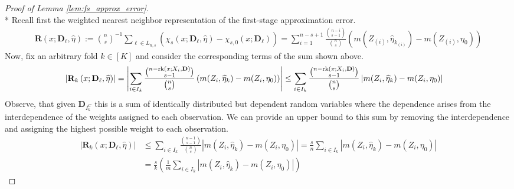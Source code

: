 \begin{proof}[Proof of Lemma \ref{lem:fs_approx_error}]\mbox{}\\*
    Recall first the weighted nearest neighbor representation of the first-stage approximation error.
    \begin{equation}
        \begin{aligned}
            \mathbf{R}\left(x; \mathbf{D}_{\ell}, \hat{\eta}\right)
            := \binom{n}{s}^{-1}\sum_{\ell \in L_{n,s}}\left(\chi_{s}\left(x; \mathbf{D}_{\ell}, \hat{\eta}\right) - \chi_{s,0}\left(x; \mathbf{D}_{\ell}\right)\right) 
            = \sum_{i = 1}^{n - s + 1} \frac{\binom{n-i}{s-1}}{\binom{n}{s}} \left(m(Z_{(i)}, \hat{\eta}_{k_{(i)}}) - m(Z_{(i)}, \eta_{0})\right)
        \end{aligned}
    \end{equation}
    Now, fix an arbitrary fold $k \in [K]$ and consider the corresponding terms of the sum shown above.
    \begin{equation}
        \begin{aligned}
            \left| \mathbf{R}_{k}\left(x; \mathbf{D}_{\ell}, \widehat{\eta}\right) \right|
            & = \left| \sum_{i \in I_{k}} \frac{\binom{n - \text{rk}(x; X_{i}, \mathbf{D})}{s-1}}{\binom{n}{s}} \left(m(Z_{i}, \widehat{\eta}_{k}) - m(Z_{i}, \eta_{0})\right) \right|
            \leq \sum_{i \in I_{k}} \frac{\binom{n - \text{rk}(x; X_{i}, \mathbf{D})}{s-1}}{\binom{n}{s}} \left|m(Z_{i}, \widehat{\eta}_{k}) - m(Z_{i}, \eta_{0}) \right|
        \end{aligned}
    \end{equation}
    Observe, that given $\mathbf{D}_{I_{k}^{C}}$ this is a sum of identically distributed but dependent random variables where the dependence arises from the interdependence of the weights assigned to each observation.
    We can provide an upper bound to this sum by removing the interdependence and assigning the highest possible weight to each observation.
    \begin{equation}\label{eq:equal_weight_ineq}
        \begin{aligned}
            \left| \mathbf{R}_{k}\left(x; \mathbf{D}_{\ell}, \hat{\eta}\right) \right| 
            & \leq \sum_{i \in I_{k}} \frac{\binom{n - 1}{s-1}}{\binom{n}{s}} \left|m(Z_{i}, \hat{\eta}_{k}) - m(Z_{i}, \eta_{0}) \right|
            = \frac{s}{n} \sum_{i \in I_{k}} \left|m(Z_{i}, \hat{\eta}_{k}) - m(Z_{i}, \eta_{0}) \right| \\
            & = \frac{s}{k} \left(\frac{1}{m} \sum_{i \in I_{k}} \left|m(Z_{i}, \hat{\eta}_{k}) - m(Z_{i}, \eta_{0}) \right|\right)

\end{aligned}
\end{equation}
\end{proof}
